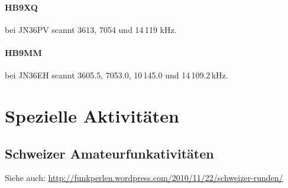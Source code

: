 \paragraph{HB9XQ} bei JN36PV scannt 3613, 7054 und 14\,119 kHz.
\paragraph{HB9MM} bei JN36EH scannt 3605.5, 7053.0, 10\,145.0 und 14\,109.2\,kHz.


\section{Spezielle Aktivitäten}

\subsection{Schweizer Amateurfunkativitäten}
Siehe auch: \href{http://funkperlen.wordpress.com/2010/11/22/schweizer-runden/}{http://funkperlen.wordpress.com/2010/11/22/schweizer-runden/}

